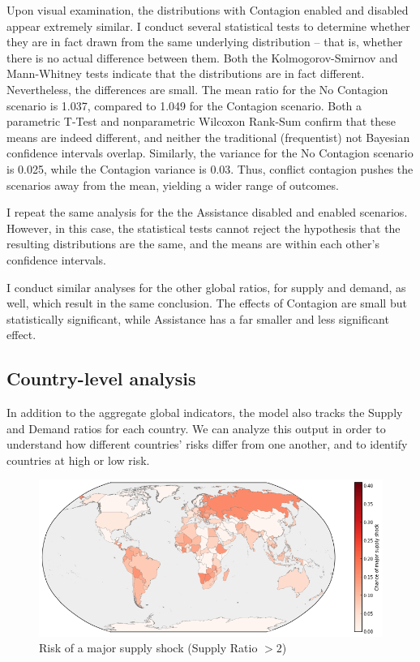 \documentclass{llncs}
\begin{document}
Upon visual examination, the distributions with Contagion enabled and disabled appear extremely similar. I conduct several statistical tests to determine whether they are in fact drawn from the same underlying distribution -- that is, whether there is no actual difference between them. Both the Kolmogorov-Smirnov  and Mann-Whitney tests indicate that the distributions are in fact different. Nevertheless, the differences are small. The mean ratio for the No Contagion scenario is 1.037, compared to 1.049 for the Contagion scenario. Both a parametric T-Test and nonparametric Wilcoxon Rank-Sum confirm that these means are indeed different, and neither the traditional (frequentist) not Bayesian confidence intervals overlap. Similarly, the variance for the No Contagion scenario is 0.025, while the Contagion variance is 0.03. Thus, conflict contagion pushes the scenarios away from the mean, yielding a wider range of outcomes. 

I repeat the same analysis for the the Assistance disabled and enabled scenarios. However, in this case, the statistical tests cannot reject the hypothesis that the resulting distributions are the same, and the means are within each other's confidence intervals.

I conduct similar analyses for the other global ratios, for supply and demand, as well, which result in the same conclusion. The effects of Contagion are small but statistically significant, while Assistance has a far smaller and less significant effect.

\subsection{Country-level analysis}

In addition to the aggregate global indicators, the model also tracks the Supply and Demand ratios for each country. We can analyze this output in order to understand how different countries' risks differ from one another, and to identify countries at high or low risk.

\begin{figure}[h!]
	\centering
	\includegraphics[width=\textwidth]{../Graphics/SupplyShockMap}
	\caption{Risk of a major supply shock (Supply Ratio $>2$)}

\end{figure}
\end{document}
